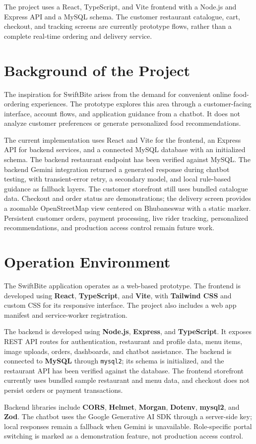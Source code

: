 The project uses a React, TypeScript, and Vite frontend with a Node.js and Express API and a MySQL schema. The customer restaurant catalogue, cart, checkout, and tracking screens are currently prototype flows, rather than a complete real-time ordering and delivery service.

\section{Background of the Project}

The inspiration for SwiftBite arises from the demand for convenient online food-ordering experiences. The prototype explores this area through a customer-facing interface, account flows, and application guidance from a chatbot. It does not analyze customer preferences or generate personalized food recommendations.

The current implementation uses React and Vite for the frontend, an Express API for backend services, and a connected MySQL database with an initialized schema. The backend restaurant endpoint has been verified against MySQL. The backend Gemini integration returned a generated response during chatbot testing, with transient-error retry, a secondary model, and local rule-based guidance as fallback layers. The customer storefront still uses bundled catalogue data. Checkout and order status are demonstrations; the delivery screen provides a zoomable OpenStreetMap view centered on Bhubaneswar with a static marker. Persistent customer orders, payment processing, live rider tracking, personalized recommendations, and production access control remain future work.

\section{Operation Environment}

The SwiftBite application operates as a web-based prototype. The frontend is developed using \textbf{React}, \textbf{TypeScript}, and \textbf{Vite}, with \textbf{Tailwind CSS} and custom CSS for its responsive interface. The project also includes a web app manifest and service-worker registration.

The backend is developed using \textbf{Node.js}, \textbf{Express}, and \textbf{TypeScript}. It exposes REST API routes for authentication, restaurant and profile data, menu items, image uploads, orders, dashboards, and chatbot assistance. The backend is connected to \textbf{MySQL} through \texttt{mysql2}; its schema is initialized, and the restaurant API has been verified against the database. The frontend storefront currently uses bundled sample restaurant and menu data, and checkout does not persist orders or payment transactions.

Backend libraries include \textbf{CORS}, \textbf{Helmet}, \textbf{Morgan}, \textbf{Dotenv}, \textbf{mysql2}, and \textbf{Zod}. The chatbot uses the Google Generative AI SDK through a server-side key; local responses remain a fallback when Gemini is unavailable. Role-specific portal switching is marked as a demonstration feature, not production access control.